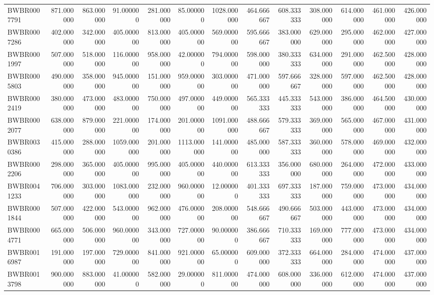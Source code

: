 \begin{longtable}{lrrrrrrrrrrrr}
BWBR0007791 & 871.000000 & 863.000000 & 91.000000 & 281.000000 & 85.000000 & 1028.000000 & 464.666667 & 608.333333 & 308.000000 & 614.000000 & 461.000000 & 426.000000 \\
BWBR0007286 & 402.000000 & 342.000000 & 405.000000 & 813.000000 & 405.000000 & 569.000000 & 595.666667 & 383.000000 & 629.000000 & 295.000000 & 462.000000 & 427.000000 \\
BWBR0001997 & 507.000000 & 518.000000 & 116.000000 & 958.000000 & 42.000000 & 794.000000 & 598.000000 & 380.333333 & 634.000000 & 291.000000 & 462.500000 & 428.000000 \\
BWBR0005803 & 490.000000 & 358.000000 & 945.000000 & 151.000000 & 959.000000 & 303.000000 & 471.000000 & 597.666667 & 328.000000 & 597.000000 & 462.500000 & 428.000000 \\
BWBR0002419 & 380.000000 & 473.000000 & 483.000000 & 750.000000 & 497.000000 & 449.000000 & 565.333333 & 445.333333 & 543.000000 & 386.000000 & 464.500000 & 430.000000 \\
BWBR0002077 & 638.000000 & 879.000000 & 221.000000 & 174.000000 & 201.000000 & 1091.000000 & 488.666667 & 579.333333 & 369.000000 & 565.000000 & 467.000000 & 431.000000 \\
BWBR0030386 & 415.000000 & 288.000000 & 1059.000000 & 201.000000 & 1113.000000 & 141.000000 & 485.000000 & 587.333333 & 360.000000 & 578.000000 & 469.000000 & 432.000000 \\
BWBR0002206 & 298.000000 & 365.000000 & 405.000000 & 995.000000 & 405.000000 & 440.000000 & 613.333333 & 356.000000 & 680.000000 & 264.000000 & 472.000000 & 433.000000 \\
BWBR0041233 & 706.000000 & 303.000000 & 1083.000000 & 232.000000 & 960.000000 & 12.000000 & 401.333333 & 697.333333 & 187.000000 & 759.000000 & 473.000000 & 434.000000 \\
BWBR0001844 & 507.000000 & 422.000000 & 543.000000 & 962.000000 & 476.000000 & 208.000000 & 548.666667 & 490.666667 & 503.000000 & 443.000000 & 473.000000 & 434.000000 \\
BWBR0004771 & 665.000000 & 506.000000 & 960.000000 & 343.000000 & 727.000000 & 90.000000 & 386.666667 & 710.333333 & 169.000000 & 777.000000 & 473.000000 & 434.000000 \\
BWBR0016987 & 191.000000 & 197.000000 & 729.000000 & 841.000000 & 921.000000 & 65.000000 & 609.000000 & 372.333333 & 664.000000 & 284.000000 & 474.000000 & 437.000000 \\
BWBR0013798 & 900.000000 & 883.000000 & 41.000000 & 582.000000 & 29.000000 & 811.000000 & 474.000000 & 608.000000 & 336.000000 & 612.000000 & 474.000000 & 437.000000 \\

\end{longtable}
